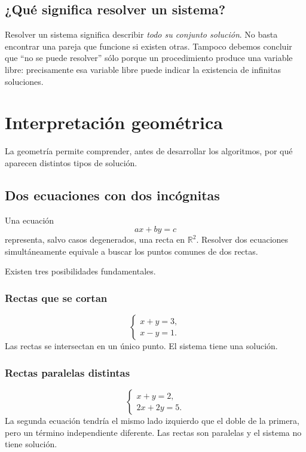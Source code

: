 \documentclass[12pt]{article}
\theoremstyle{remark}
\newcommand{\R}{\mathbb{R}}
\begin{document}
\subsection{¿Qué significa resolver un sistema?}

Resolver un sistema significa describir \emph{todo su conjunto solución}. No basta encontrar una pareja
que funcione si existen otras. Tampoco debemos concluir que ``no se puede resolver'' sólo porque un
procedimiento produce una variable libre: precisamente esa variable libre puede indicar la existencia
de infinitas soluciones.

\section{Interpretación geométrica}

La geometría permite comprender, antes de desarrollar los algoritmos, por qué aparecen distintos tipos
de solución.

\subsection{Dos ecuaciones con dos incógnitas}

Una ecuación
\[
ax+by=c
\]
representa, salvo casos degenerados, una recta en $\R^2$. Resolver dos ecuaciones simultáneamente
equivale a buscar los puntos comunes de dos rectas.

Existen tres posibilidades fundamentales.

\subsubsection*{Rectas que se cortan}
\[
\begin{cases}
x+y=3,\\
x-y=1.
\end{cases}
\]
Las rectas se intersectan en un único punto. El sistema tiene una solución.

\subsubsection*{Rectas paralelas distintas}
\[
\begin{cases}
x+y=2,\\
2x+2y=5.
\end{cases}
\]
La segunda ecuación tendría el mismo lado izquierdo que el doble de la primera, pero un término
independiente diferente. Las rectas son paralelas y el sistema no tiene solución.
\end{document}
